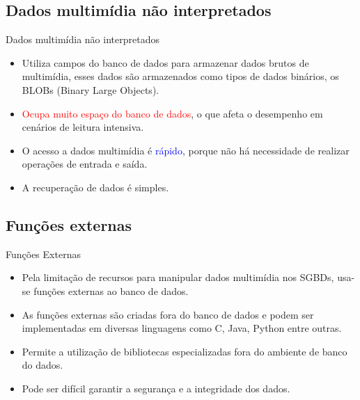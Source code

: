 \documentclass{beamer}
\begin{document}
    \subsection{Dados multimídia não interpretados}
        \begin{frame}{Dados multimídia não interpretados}
            \begin{itemize}
                \item Utiliza campos do banco de dados para armazenar dados brutos de multimídia, esses dados são armazenados como tipos de dados binários, os BLOBs (Binary Large Objects).
                \pause \item \textcolor{red}{Ocupa muito espaço do banco de dados}, o que afeta o desempenho em cenários de leitura intensiva.
                \pause \item O acesso a dados multimídia é \textcolor{blue}{rápido}, porque não há necessidade de realizar operações de entrada e saída.
                \pause \item A recuperação de dados é simples.
            \end{itemize}
        \end{frame}

    \subsection{Funções externas}
        \begin{frame}{Funções Externas}
            \begin{itemize}
                \item Pela limitação de recursos para manipular dados multimídia nos SGBDs, usa-se funções externas ao banco de dados.
                \pause \item As funções externas são criadas fora do banco de dados e podem ser implementadas em diversas linguagens como C, Java, Python entre outras.
                \pause \item Permite a utilização de bibliotecas especializadas fora do ambiente de banco do dados.
                \pause \item Pode ser difícil garantir a segurança e a integridade dos dados.
            \end{itemize}
        \end{frame}
\end{document}
